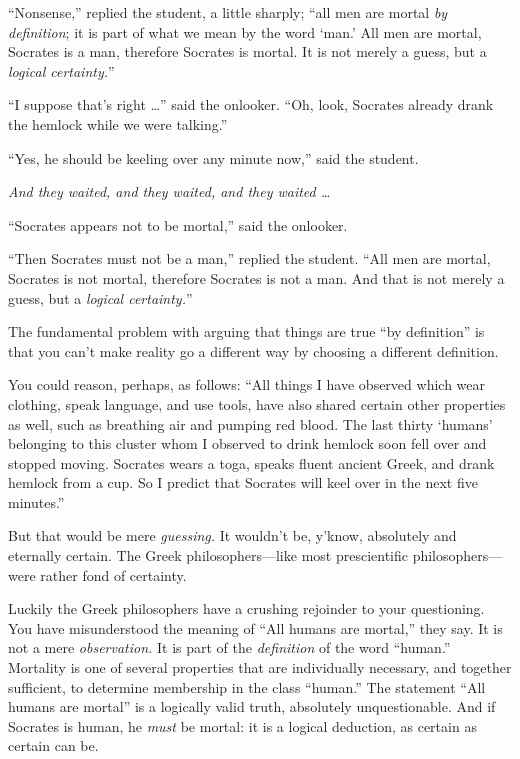 {
 ``Nonsense,'' replied the
student, a little sharply; ``all men are mortal
\textit{by definition}; it is part of what we mean by the word
`man.' All men are mortal, Socrates is a
man, therefore Socrates is mortal. It is not merely a guess, but a
\textit{logical certainty.}''}

{
 ``I suppose that's right
\ldots'' said the onlooker. ``Oh,
look, Socrates already drank the hemlock while we were
talking.''}

{
 ``Yes, he should be keeling over any minute
now,'' said the student.}

{
 \textit{And they waited, and they waited, and they waited \ldots}}

{
 ``Socrates appears not to be
mortal,'' said the onlooker.}

{
 ``Then Socrates must not be a
man,'' replied the student. ``All
men are mortal, Socrates is not mortal, therefore Socrates is not a
man. And that is not merely a guess, but a \textit{logical
certainty.}''}

{
 The fundamental problem with arguing that things are true
``by definition'' is that you
can't make reality go a different way by choosing a
different definition.}

{
 You could reason, perhaps, as follows: ``All
things I have observed which wear clothing, speak language, and use
tools, have also shared certain other properties as well, such as
breathing air and pumping red blood. The last thirty
`humans' belonging to this cluster whom
I observed to drink hemlock soon fell over and stopped moving. Socrates
wears a toga, speaks fluent ancient Greek, and drank hemlock from a
cup. So I predict that Socrates will keel over in the next five
minutes.''}

{
 But that would be mere \textit{guessing.} It
wouldn't be, y'know, absolutely and
eternally certain. The Greek philosophers---like most prescientific
philosophers---were rather fond of certainty.}

{
 Luckily the Greek philosophers have a crushing rejoinder to your
questioning. You have misunderstood the meaning of
``All humans are mortal,'' they say.
It is not a mere \textit{observation.} It is part of the
\textit{definition} of the word
``human.'' Mortality is one of
several properties that are individually necessary, and together
sufficient, to determine membership in the class
``human.'' The statement
``All humans are mortal'' is a
logically valid truth, absolutely unquestionable. And if Socrates is
human, he \textit{must} be mortal: it is a logical deduction, as
certain as certain can be.}

